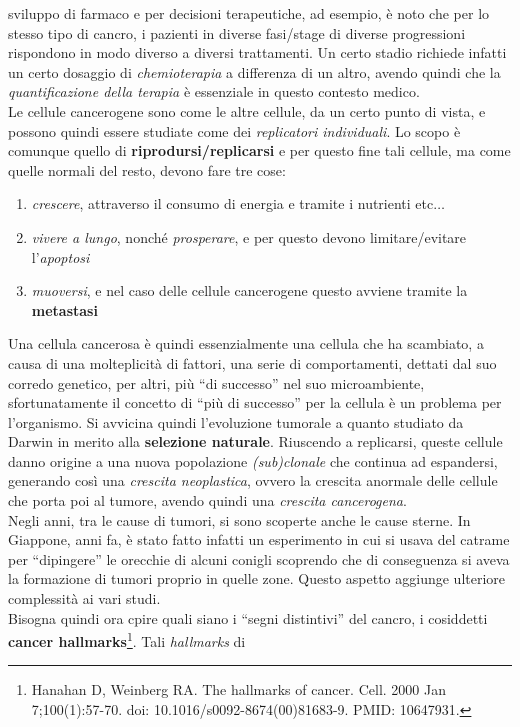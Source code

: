 \documentclass[a4paper,12pt, oneside]{book}
\begin{document}
sviluppo di farmaco e per decisioni terapeutiche, ad esempio, è noto che per lo
stesso tipo di cancro, i pazienti in diverse fasi/stage di diverse progressioni
rispondono in modo diverso a diversi trattamenti. Un certo stadio richiede
infatti un certo dosaggio di \textit{chemioterapia} a differenza di un altro,
avendo quindi che la \textit{quantificazione della terapia} è essenziale in
questo contesto medico.\\
Le cellule cancerogene sono come le altre cellule, da un certo punto di vista, e
possono quindi essere studiate come dei \textit{replicatori individuali}. Lo
scopo è comunque quello di \textbf{riprodursi/replicarsi} e per questo fine tali
cellule, ma come quelle normali del resto, devono fare tre cose:
\begin{enumerate}
  \item \textit{crescere}, attraverso il consumo di energia e tramite i
  nutrienti etc$\ldots$
  \item \textit{vivere a lungo}, nonché \textit{prosperare}, e per questo devono
  limitare/evitare l'\textit{apoptosi}
  \item \textit{muoversi}, e nel caso delle cellule cancerogene questo avviene
  tramite la \textbf{metastasi}
\end{enumerate}
Una cellula cancerosa è quindi essenzialmente una cellula che ha scambiato, a
causa di una molteplicità di fattori, una
serie di comportamenti, dettati dal suo corredo genetico, per altri, più ``di
successo'' nel suo microambiente, sfortunatamente il concetto di ``più di
successo'' per la cellula è un problema per l'organismo. Si avvicina quindi
l'evoluzione tumorale a quanto studiato da Darwin in merito alla
\textbf{selezione naturale}. Riuscendo a replicarsi, queste cellule danno
origine a una nuova popolazione \textit{(sub)clonale} che continua ad
espandersi, generando così una \textit{crescita neoplastica}, ovvero la crescita
anormale delle cellule che porta poi al tumore, avendo quindi una
\textit{crescita cancerogena}. \\
Negli anni, tra le cause di tumori, si sono scoperte anche le cause sterne. In
Giappone, anni fa, è stato fatto infatti un esperimento in cui si usava del
catrame per ``dipingere'' le orecchie di alcuni conigli scoprendo che di
conseguenza si aveva la formazione di tumori proprio in quelle zone. Questo
aspetto aggiunge ulteriore complessità ai vari studi.\\
Bisogna quindi ora cpire quali siano i ``segni distintivi'' del cancro, i
cosiddetti \textbf{cancer hallmarks}\footnote{Hanahan D, Weinberg RA. The
  hallmarks of cancer. Cell. 2000 Jan 7;100(1):57-70. doi:
  10.1016/s0092-8674(00)81683-9. PMID: 10647931.}. Tali \textit{hallmarks} di
\end{document}
